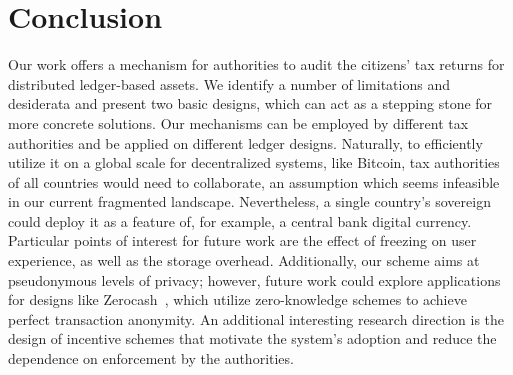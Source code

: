 \section{Conclusion}\label{sec:conclusion}

Our work offers a mechanism for authorities to audit the citizens' tax returns
for distributed ledger-based assets. We identify a number of limitations and
desiderata and present two basic designs, which can act as a stepping stone for
more concrete solutions. Our mechanisms can be employed by different tax
authorities and be applied on different ledger designs. Naturally, to
efficiently utilize it on a global scale for decentralized systems, like
Bitcoin, tax authorities of all countries would need to collaborate, an
assumption which seems infeasible in our current fragmented landscape.
Nevertheless, a single country's sovereign could deploy it as a feature of, for
example, a central bank digital currency.  Particular points of interest for
future work are the effect of freezing on user experience, as well as the
storage overhead. Additionally, our scheme aims at pseudonymous levels of
privacy; however, future work could explore applications for designs like
Zerocash~\cite{SP:BCGGMT14}, which utilize zero-knowledge schemes to achieve
perfect transaction anonymity.  An additional interesting research direction is
the design of incentive schemes that motivate the system's adoption and reduce
the dependence on enforcement by the authorities.
